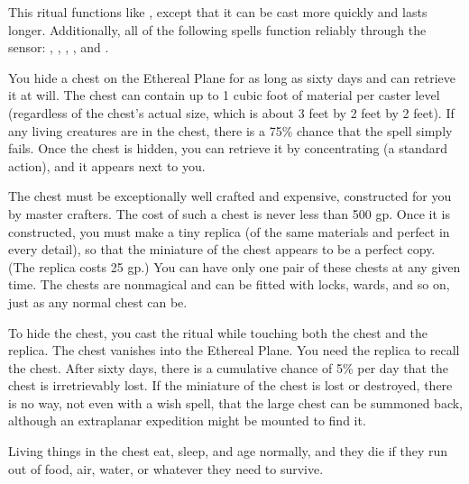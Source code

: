 \spelldur{\durext}
\spelleffect This ritual functions like , except that it can be cast more quickly and lasts longer. Additionally, all of the following spells function reliably through the sensor: , , , , and .

\spelleffect You hide a chest on the Ethereal Plane for as long as sixty days and can retrieve it at will. The chest can contain up to 1 cubic foot of material per caster level (regardless of the chest's actual size, which is about 3 feet by 2 feet by 2 feet). If any living creatures are in the chest, there is a 75\% chance that the spell simply fails. Once the chest is hidden, you can retrieve it by concentrating (a standard action), and it appears next to you.
\par The chest must be exceptionally well crafted and expensive, constructed for you by master crafters. The cost of such a chest is never less than 500 gp. Once it is constructed, you must make a tiny replica (of the same materials and perfect in every detail), so that the miniature of the chest appears to be a perfect copy. (The replica costs 25 gp.) You can have only one pair of these chests at any given time. The chests are nonmagical and can be fitted with locks, wards, and so on, just as any normal chest can be.
\par To hide the chest, you cast the ritual while touching both the chest and the replica. The chest vanishes into the Ethereal Plane. You need the replica to recall the chest. After sixty days, there is a cumulative chance of 5\% per day that the chest is irretrievably lost. If the miniature of the chest is lost or destroyed, there is no way, not even with a wish spell, that the large chest can be summoned back, although an extraplanar expedition might be mounted to find it.
\par Living things in the chest eat, sleep, and age normally, and they die if they run out of food, air, water, or whatever they need to survive.

